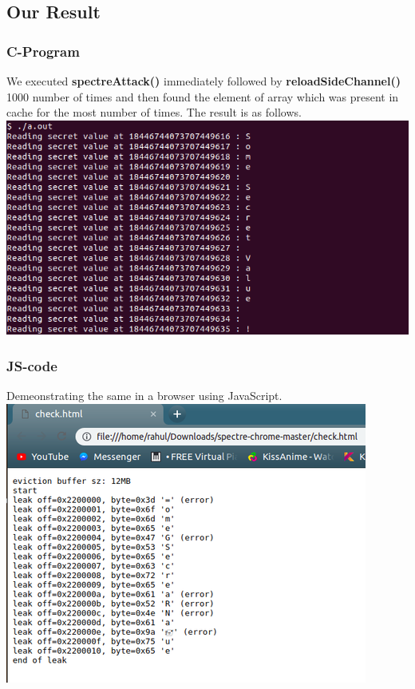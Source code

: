 \documentclass[12pt]{article}
\begin{document}
  
\subsection{Our Result\cite{GITHUB_LINK}}

\subsubsection{C-Program}
We executed \textbf{spectreAttack()} immediately followed by \textbf{reloadSideChannel()} 1000 number of times and then found the element of array which was present in cache for the most number of times. The result is as follows.\\

\vspace*{0.0 cm}
	{\centering
    \vspace*{0.0 cm}
\includegraphics[scale = 0.5]{spectre.png}\\[1.0 cm]}
\subsubsection{JS-code}
Demeonstrating the same in a browser using JavaScript.\\

\vspace*{0.0 cm}
	{\centering
    \vspace*{0.5 cm}
\includegraphics[scale = 0.7]{spectre_javascript.png}\\[1.0 cm]}
\end{document}
